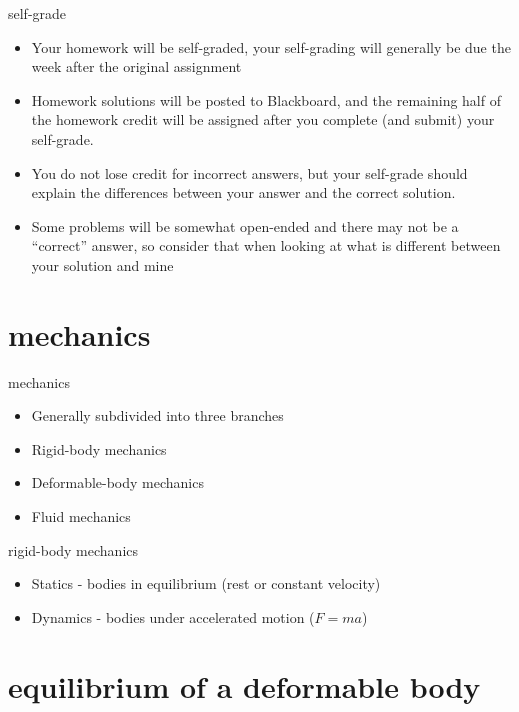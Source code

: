 \documentclass[12pt,handout]{beamer}
\providecommand{\tightlist}{%
  \setlength{\itemsep}{0pt}\setlength{\parskip}{0pt}}
\providecommand{\tightlist}{%
\setlength{\itemsep}{0pt}\setlength{\parskip}{0pt}}
\begin{document}
\begin{frame}{self-grade}
\protect\hypertarget{self-grade}{}
\begin{itemize}
\tightlist
\item
  Your homework will be self-graded, your self-grading will generally be
  due the week after the original assignment
\item
  Homework solutions will be posted to Blackboard, and the remaining
  half of the homework credit will be assigned after you complete (and
  submit) your self-grade.
\item
  You do not lose credit for incorrect answers, but your self-grade
  should explain the differences between your answer and the correct
  solution.
\item
  Some problems will be somewhat open-ended and there may not be a
  ``correct'' answer, so consider that when looking at what is different
  between your solution and mine
\end{itemize}
\end{frame}

\hypertarget{mechanics}{%
\section{mechanics}\label{mechanics}}

\begin{frame}{mechanics}
\protect\hypertarget{mechanics-1}{}
\begin{itemize}
\tightlist
\item
  Generally subdivided into three branches
\item
  Rigid-body mechanics
\item
  Deformable-body mechanics
\item
  Fluid mechanics
\end{itemize}
\end{frame}

\begin{frame}{rigid-body mechanics}
\protect\hypertarget{rigid-body-mechanics}{}
\begin{itemize}
\tightlist
\item
  Statics - bodies in equilibrium (rest or constant velocity)
\item
  Dynamics - bodies under accelerated motion (\(F=ma\))
\end{itemize}
\end{frame}

\hypertarget{equilibrium-of-a-deformable-body}{%
\section{equilibrium of a deformable
body}\label{equilibrium-of-a-deformable-body}}
\end{document}
